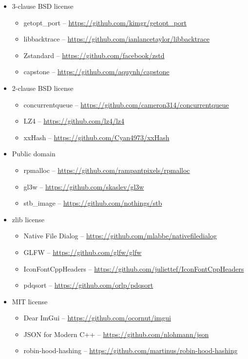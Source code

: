\documentclass[hidelinks,titlepage,a4paper]{article}
\begin{document}
\begin{itemize}
\item 3-clause BSD license
\begin{itemize}
\item getopt\_port -- \url{https://github.com/kimgr/getopt\_port}
\item libbacktrace \faStar{} -- \url{https://github.com/ianlancetaylor/libbacktrace}
\item Zstandard -- \url{https://github.com/facebook/zstd}
\item capstone -- \url{https://github.com/aquynh/capstone}
\end{itemize}

\item 2-clause BSD license
\begin{itemize}
\item concurrentqueue \faStar{} -- \url{https://github.com/cameron314/concurrentqueue}
\item LZ4 \faStar{} -- \url{https://github.com/lz4/lz4}
\item xxHash -- \url{https://github.com/Cyan4973/xxHash}
\end{itemize}

\item Public domain
\begin{itemize}
\item rpmalloc \faStar{} -- \url{https://github.com/rampantpixels/rpmalloc}
\item gl3w -- \url{https://github.com/skaslev/gl3w}
\item stb\_image -- \url{https://github.com/nothings/stb}
\end{itemize}

\item zlib license
\begin{itemize}
\item Native File Dialog -- \url{https://github.com/mlabbe/nativefiledialog}
\item GLFW -- \url{https://github.com/glfw/glfw}
\item IconFontCppHeaders -- \url{https://github.com/juliettef/IconFontCppHeaders}
\item pdqsort -- \url{https://github.com/orlp/pdqsort}
\end{itemize}

\item MIT license
\begin{itemize}
\item Dear ImGui -- \url{https://github.com/ocornut/imgui}
\item JSON for Modern C++ -- \url{https://github.com/nlohmann/json}
\item robin-hood-hashing -- \url{https://github.com/martinus/robin-hood-hashing}
\end{itemize}


\end{itemize}
\end{document}
